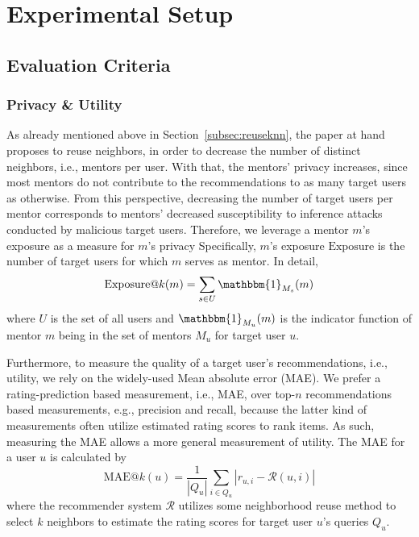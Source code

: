 \documentclass[manuscript,review,anonymous]{acmart}
\begin{document}
\section{Experimental Setup}
\subsection{Evaluation Criteria}
\subsubsection{Privacy \& Utility}
As already mentioned above in Section~\ref{subsec:reuseknn}, the paper at hand proposes to reuse neighbors, in order to decrease the number of distinct neighbors, i.e., mentors per user.
With that, the mentors' privacy increases, since most mentors do not contribute to the recommendations to as many target users as otherwise.
From this perspective, decreasing the number of target users per mentor corresponds to mentors' decreased susceptibility to inference attacks conducted by malicious target users.
Therefore, we leverage a mentor $m$'s exposure as a measure for $m$'s privacy
Specifically, $m$'s exposure $\mathrm{Exposure}$ is the number of target users for which $m$ serves as mentor.
In detail, 
\begin{equation}
    \mathrm{Exposure}@k(m) = \sum_{s \in U} \mathbbm{1}_{M_s}(m)
\end{equation}
where $U$ is the set of all users and $\mathbbm{1}_{M_u}(m)$ is the indicator function of mentor $m$ being in the set of mentors $M_u$ for target user $u$.

Furthermore, to measure the quality of a target user's recommendations, i.e., utility, we rely on the widely-used Mean absolute error (MAE).
We prefer a rating-prediction based measurement, i.e., MAE, over top-$n$ recommendations based measurements, e.g., precision and recall, because the latter kind of measurements often utilize estimated rating scores to rank items.
As such, measuring the MAE allows a more general measurement of utility.
The MAE for a user $u$ is calculated by
\begin{equation}
    \mathrm{MAE}@k(u) = \frac{1}{|Q_u|} \sum_{i \in Q_u} |r_{u, i} - \mathcal{R}(u, i)| 
\end{equation}
where the recommender system $\mathcal{R}$ utilizes some neighborhood reuse method to select $k$ neighbors to estimate the rating scores for target user $u$'s queries $Q_u$.
\end{document}
